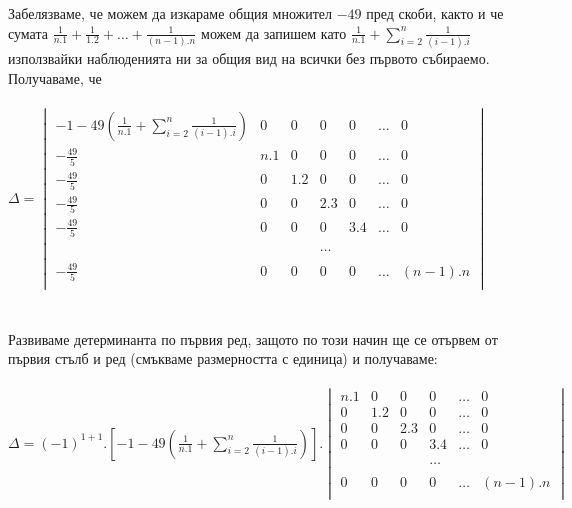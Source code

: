 \documentclass[a4paper, 12pt]{article}
\begin{document}
    Забелязваме, че можем да изкараме общия множител $-49$ пред скоби,
    както и че сумата $\frac{1}{n.1} + \frac{1}{1.2} + \dots + \frac{1}{(n - 1).n}$
    можем да запишем като $\frac{1}{n.1} + \displaystyle\sum_{i = 2}^n \frac{1}{(i - 1).i}$
    използвайки наблюденията ни за общия вид на всички без първото събираемо. Получаваме, че \\\\
    $\Delta = \begin{vmatrix}
        -1 -49\left(\frac{1}{n.1} + \displaystyle\sum_{i = 2}^n \frac{1}{(i - 1).i}\right)  & 0 & 0 & 0 & 0 & \dots & 0\\
        -\frac{49}{5} & n.1 & 0 & 0 & 0 & \dots & 0\\
        -\frac{49}{5} & 0 & 1.2 & 0 & 0 & \dots & 0\\
        -\frac{49}{5} & 0 & 0 & 2.3 & 0 & \dots & 0\\
        -\frac{49}{5} & 0 & 0 & 0 & 3. 4 & \dots & 0\\
        \\
        ~ & ~ & ~ & \dots & ~ & ~ & ~\\
        \\
        -\frac{49}{5} & 0 & 0 & 0 & 0 & \dots & (n - 1).n\\
    \end{vmatrix}$ \\\\\\

    Развиваме детерминанта по първия ред, защото по този начин ще се отървем от първия стълб и ред (смъкваме размерността с единица) и получаваме: \\\\
    
    $\Delta = (-1)^{1 + 1}.\left[-1 -49\left(\frac{1}{n.1} + \displaystyle\sum_{i = 2}^n \frac{1}{(i - 1).i}\right)\right].\begin{vmatrix}
        n.1 & 0 & 0 & 0 & \dots & 0\\
        0 & 1.2 & 0 & 0 & \dots & 0\\
        0 & 0 & 2.3 & 0 & \dots & 0\\
        0 & 0 & 0 & 3. 4 & \dots & 0\\
        \\
        ~ & ~ & ~ & \dots & ~ & ~\\
        \\
        0 & 0 & 0 & 0 & \dots & (n - 1).n\\
    \end{vmatrix}$ \\\\\\
\end{document}
